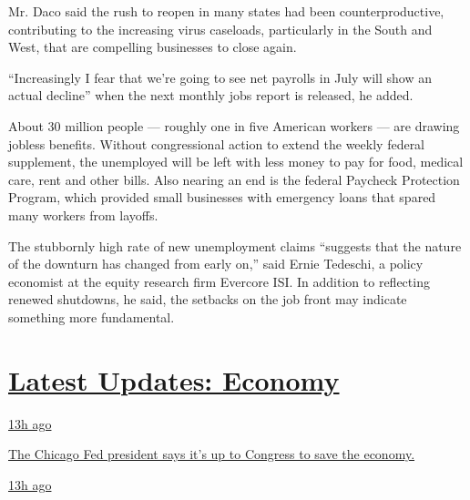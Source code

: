 Mr. Daco said the rush to reopen in many states had been
counterproductive, contributing to the increasing virus caseloads,
particularly in the South and West, that are compelling businesses to
close again.

``Increasingly I fear that we're going to see net payrolls in July will
show an actual decline'' when the next monthly jobs report is released,
he added.

About 30 million people --- roughly one in five American workers --- are
drawing jobless benefits. Without congressional action to extend the
weekly federal supplement, the unemployed will be left with less money
to pay for food, medical care, rent and other bills. Also nearing an end
is the federal Paycheck Protection Program, which provided small
businesses with emergency loans that spared many workers from layoffs.

The stubbornly high rate of new unemployment claims ``suggests that the
nature of the downturn has changed from early on,'' said Ernie Tedeschi,
a policy economist at the equity research firm Evercore ISI. In addition
to reflecting renewed shutdowns, he said, the setbacks on the job front
may indicate something more fundamental.

\hypertarget{latest-updates-economy}{%
\section{\texorpdfstring{\href{https://www.nytimes.com/live/2020/08/03/business/stock-market-today-coronavirus?action=click\&pgtype=Article\&state=default\&region=MAIN_CONTENT_1\&context=storylines_live_updates}{Latest
Updates:
Economy}}{Latest Updates: Economy}}\label{latest-updates-economy}}

\href{https://www.nytimes.com/live/2020/08/03/business/stock-market-today-coronavirus?action=click\&pgtype=Article\&state=default\&region=MAIN_CONTENT_1\&context=storylines_live_updates\#the-chicago-fed-president-says-its-up-to-congress-to-save-the-economy}{13h
ago}

\href{https://www.nytimes.com/live/2020/08/03/business/stock-market-today-coronavirus?action=click\&pgtype=Article\&state=default\&region=MAIN_CONTENT_1\&context=storylines_live_updates\#the-chicago-fed-president-says-its-up-to-congress-to-save-the-economy}{The
Chicago Fed president says it's up to Congress to save the economy.}

\href{https://www.nytimes.com/live/2020/08/03/business/stock-market-today-coronavirus?action=click\&pgtype=Article\&state=default\&region=MAIN_CONTENT_1\&context=storylines_live_updates\#faa-says-boeing-has-effectively-mitigated-defects-in-the-737-max}{13h
ago}

